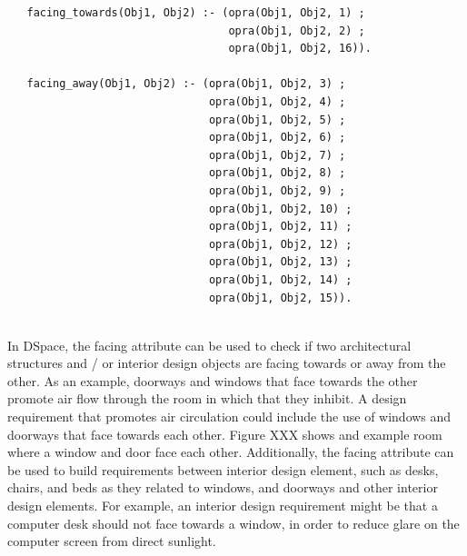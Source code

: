 \documentclass[12pt]{ucthesis}
\begin{document}
\begin{verbatim}
   facing_towards(Obj1, Obj2) :- (opra(Obj1, Obj2, 1) ;
                                  opra(Obj1, Obj2, 2) ;
                                  opra(Obj1, Obj2, 16)).
                                 
   facing_away(Obj1, Obj2) :- (opra(Obj1, Obj2, 3) ;
                               opra(Obj1, Obj2, 4) ;
                               opra(Obj1, Obj2, 5) ;
                               opra(Obj1, Obj2, 6) ;
                               opra(Obj1, Obj2, 7) ;
                               opra(Obj1, Obj2, 8) ;
                               opra(Obj1, Obj2, 9) ;
                               opra(Obj1, Obj2, 10) ;
                               opra(Obj1, Obj2, 11) ;
                               opra(Obj1, Obj2, 12) ;
                               opra(Obj1, Obj2, 13) ;
                               opra(Obj1, Obj2, 14) ;
                               opra(Obj1, Obj2, 15)).
                                  
\end{verbatim}

In DSpace, the facing attribute can be used to check if two architectural structures and / or interior design objects are facing towards or away from the other. As an example, doorways and windows that face towards the other promote air flow through the room in which that they inhibit. A design requirement that promotes air circulation could include the use of windows and doorways that face towards each other. Figure XXX shows and example room where a window and door face each other. Additionally, the facing attribute can be used to build requirements between interior design element, such as desks, chairs, and beds as they related to windows, and doorways and other interior design elements. For example, an interior design requirement might be that a computer desk should not face towards a window, in order to reduce glare on the computer screen from direct sunlight. 
\end{document}
